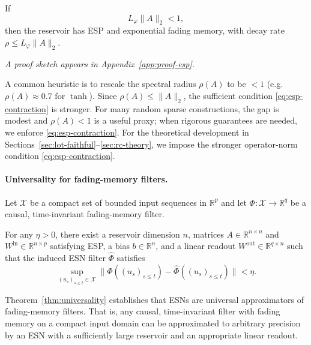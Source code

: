 \documentclass[11pt]{article}
\newcommand{\R}{\mathbb{R}}
\newcommand{\1}{\mathbf{1}}
\begin{document}
\begin{proposition}\label{prop:esp}
If
\begin{equation}\label{eq:esp-contraction}
L_\varphi\|A\|_2<1,
\end{equation}
then the reservoir has ESP and exponential fading memory, with decay rate $\rho\le L_\varphi\|A\|_2$.
\end{proposition}
\noindent\emph{A proof sketch appears in Appendix~\ref{app:proof-esp}.}

\begin{remark}\label{rem:esp-norm}
A common heuristic is to rescale the spectral radius $\rho(A)$ to be $<1$ (e.g.\ $\rho(A)\approx 0.7$
for $\tanh$). Since $\rho(A)\le\|A\|_2$, the sufficient condition \eqref{eq:esp-contraction} is stronger.
For many random sparse constructions, the gap is modest and $\rho(A)<1$ is a useful proxy; when rigorous
guarantees are needed, we enforce \eqref{eq:esp-contraction}. For the theoretical development in Sections~\ref{sec:lot-faithful}--\ref{sec:rc-theory}, we impose the stronger operator-norm condition \eqref{eq:esp-contraction}.
\end{remark}

\paragraph{Universality for fading-memory filters.} Let $\mathcal X$ be a compact set of bounded input sequences in $\R^p$ and let $\Phi:\mathcal X\to\R^q$ be a causal, time-invariant fading-memory filter. \\

\begin{theorem}\label{thm:universality}
For any $\eta>0$, there exist a reservoir dimension $n$, matrices
$A\in\R^{n\times n}$ and $W^{\mathrm{in}}\in\R^{n\times p}$ satisfying ESP,
a bias $b\in\R^n$, and a linear readout $W^{\mathrm{out}}\in\R^{q\times n}$
such that the induced ESN filter $\widehat\Phi$ satisfies
\[
\sup_{(u_s)_{s\le t}\in\mathcal X}\|\Phi((u_s)_{s\le t})-\widehat\Phi((u_s)_{s\le t})\|<\eta.
\]
\end{theorem}

Theorem~\ref{thm:universality} establishes that ESNs are universal approximators of fading-memory filters. That is, any causal, time-invariant filter with fading memory on a compact input domain can be approximated to arbitrary precision by an ESN with a sufficiently large reservoir and an appropriate linear readout. 
\end{document}
